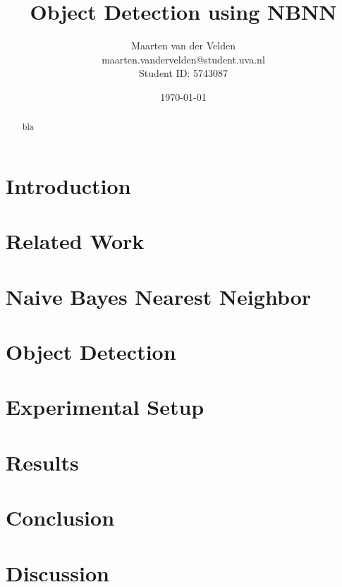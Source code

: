 \documentclass[a4paper,10pt]{article}
\title{Object Detection using NBNN}
\author{Maarten van der Velden\\maarten.vandervelden@student.uva.nl\\Student ID: 5743087}
\date{\today}
\begin{document}
\begin{titlepage}
    \vspace{10cm}
    \maketitle
    \thispagestyle{empty}
\end{titlepage}


\begin{abstract}
    bla
\end{abstract}
\section{Introduction} %
\label{sec:introduction}
\cite{boiman2008defense}


\section{Related Work} %
\label{sec:related_work}


\section{Naive Bayes Nearest Neighbor} %
\label{sec:naive_bayes_nearest_neighbor}


\section{Object Detection} %
\label{sec:object_detection}


\section{Experimental Setup} %
\label{sec:experimental_setup}


\section{Results} %
\label{sec:results}


\section{Conclusion} %
\label{sec:conclusion}


\section{Discussion} %
\label{sec:discussion}




\end{document}
